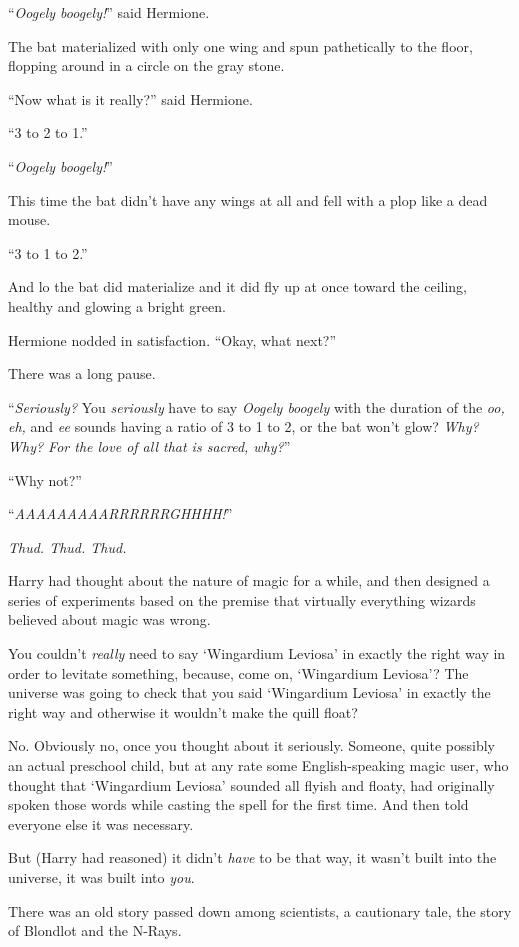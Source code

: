 ``\emph{Oogely boogely!}'' said Hermione.

The bat materialized with only one wing and spun pathetically to the floor, flopping around in a circle on the gray stone.

``Now what is it really?'' said Hermione.

``3 to 2 to 1.''

``\emph{Oogely boogely!}''

This time the bat didn't have any wings at all and fell with a plop like a dead mouse.

``3 to 1 to 2.''

And lo the bat did materialize and it did fly up at once toward the ceiling, healthy and glowing a bright green.

Hermione nodded in satisfaction. ``Okay, what next?''

There was a long pause.

``\emph{Seriously?} You \emph{seriously} have to say \emph{Oogely boogely} with the duration of the \emph{oo,} \emph{eh,} and \emph{ee} sounds having a ratio of 3 to 1 to 2, or the bat won't glow? \emph{Why? Why? For the love of all that is sacred, why?}''

``Why not?''

``\emph{AAAAAAAAARRRRRRGHHHH!}''

\emph{Thud. Thud. Thud.}

Harry had thought about the nature of magic for a while, and then designed a series of experiments based on the premise that virtually everything wizards believed about magic was wrong.

You couldn't \emph{really} need to say `Wingardium Leviosa' in exactly the right way in order to levitate something, because, come on, `Wingardium Leviosa'? The universe was going to check that you said `Wingardium Leviosa' in exactly the right way and otherwise it wouldn't make the quill float?

No. Obviously no, once you thought about it seriously. Someone, quite possibly an actual preschool child, but at any rate some English-speaking magic user, who thought that `Wingardium Leviosa' sounded all flyish and floaty, had originally spoken those words while casting the spell for the first time. And then told everyone else it was necessary.

But (Harry had reasoned) it didn't \emph{have} to be that way, it wasn't built into the universe, it was built into \emph{you}.

There was an old story passed down among scientists, a cautionary tale, the story of Blondlot and the N-Rays.

